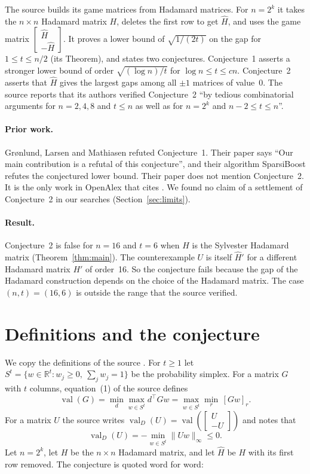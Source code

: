 \documentclass[11pt]{article}
\theoremstyle{remark}
\newcommand{\valD}{\operatorname{val}_D}
\newcommand{\val}{\operatorname{val}}
\newcommand{\Hh}{\hat H}
\begin{document}
The source builds its game matrices from Hadamard matrices. For $n=2^k$ it takes the
$n\times n$ Hadamard matrix $H$, deletes the first row to get $\Hh$, and uses the game
matrix $\left[\begin{smallmatrix}\Hh\\-\Hh\end{smallmatrix}\right]$. It proves a lower bound
of $\sqrt{1/(2t)}$ on the gap for $1\le t\le n/2$ (its Theorem), and states two conjectures.
Conjecture~1 asserts a stronger lower bound of order $\sqrt{(\log n)/t}$ for
$\log n\le t\le cn$. Conjecture~2 asserts that $\Hh$ gives the largest gaps among all $\pm1$
matrices of value~$0$. The source reports that its authors verified Conjecture~2 ``by
tedious combinatorial arguments for $n=2,4,8$ and $t\le n$ as well as for $n=2^k$ and
$n-2\le t\le n$''.

\paragraph{Prior work.} Gr{\o}nlund, Larsen and Mathiasen \cite{gronlund2019} refuted
Conjecture~1. Their paper says ``Our main contribution is a refutal of this conjecture'', and
their algorithm SparsiBoost refutes the conjectured lower bound. Their paper does not
mention Conjecture~2. It is the only work in OpenAlex that cites \cite{nie2013}. We found
no claim of a settlement of Conjecture~2 in our searches (Section~\ref{sec:limits}).

\paragraph{Result.} Conjecture~2 is false for $n=16$ and $t=6$ when $H$ is the Sylvester
Hadamard matrix (Theorem~\ref{thm:main}). The counterexample $U$ is itself $\Hh'$ for a
different Hadamard matrix $H'$ of order~16. So the conjecture fails because the gap of the
Hadamard construction depends on the choice of the Hadamard matrix. The case
$(n,t)=(16,6)$ is outside the range that the source verified.

\section{Definitions and the conjecture}

We copy the definitions of the source \cite{nie2013}. For $t\ge1$ let
$S^t=\{w\in\mathbb{R}^t: w_j\ge0,\ \sum_j w_j=1\}$ be the probability simplex. For a matrix
$G$ with $t$ columns, equation~(1) of the source defines
\[
  \val(G)=\min_{d}\max_{w\in S^t} d^\top G w=\max_{w\in S^t}\min_r\,[Gw]_r .
\]
For a matrix $U$ the source writes $\valD(U)=\val\left(\left[\begin{smallmatrix}U\\-U
\end{smallmatrix}\right]\right)$ and notes that
\[
  \valD(U)=-\min_{w\in S^t}\|Uw\|_\infty\le 0 .
\]
Let $n=2^k$, let $H$ be the $n\times n$ Hadamard matrix, and let $\Hh$ be $H$ with its
first row removed. The conjecture is quoted word for word:
\end{document}
